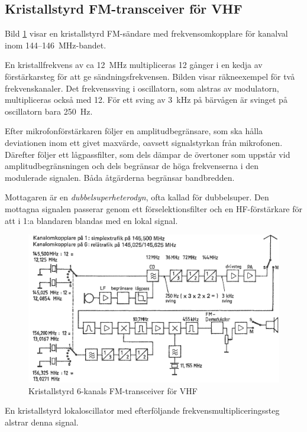 \subsection{Kristallstyrd FM-transceiver för VHF}

Bild \ref{fig:bildII5-12} visar en kristallstyrd FM-sändare med
frekvensomkopplare för kanalval inom 144--146~MHz-bandet.

En kristallfrekvens av ca 12~MHz multipliceras 12 gånger i en kedja
av förstärkarsteg för att ge sändningsfrekvensen.
Bilden visar räkneexempel för två frekvenskanaler.
Det frekvenssving i oscillatorn, som alstras av modulatorn,
multipliceras också med 12.
För ett sving av 3~kHz på bärvågen är svinget på oscillatorn bara 250~Hz.

Efter mikrofonförstärkaren följer en amplitudbegränsare, som ska
hålla deviationen inom ett givet maxvärde, oavsett signalstyrkan från
mikrofonen.
Därefter följer ett lågpassfilter, som dels dämpar de övertoner som
uppstår vid amplitudbegränsningen och dels begränsar de höga frekvenserna
i den modulerade signalen.
Båda åtgärderna begränsar bandbredden.

Mottagaren är en \emph{dubbelsuperheterodyn}, ofta kallad för dubbelsuper.
Den mottagna signalen passerar genom ett förselektionsfilter och en
HF-förstärkare för att i 1:a blandaren blandas med en lokal signal.

\begin{figure}
  \includegraphics[width=\textwidth]{images/cropped_pdfs/bild_2_5-12.pdf}
  \caption{Kristallstyrd 6-kanals FM-transceiver för VHF}
  \label{fig:bildII5-12}
\end{figure}



En kristallstyrd lokaloscillator med efterföljande
frekvensmultipliceringssteg alstrar denna signal.

